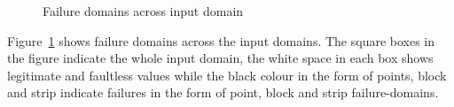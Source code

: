 \begin{figure} [H]
\centering
{}

\caption{Failure domains across input domain~\cite{chan1996proportional}}
\label{fig:patterns2}
\end{figure}



Figure~\ref{fig:patterns2} shows failure domains across the input domains. The square boxes in the figure indicate the whole input domain, the white space in each box shows legitimate and faultless values while the black colour in the form of points, block and strip indicate failures in the form of point, block and strip failure-domains.

\newpage
